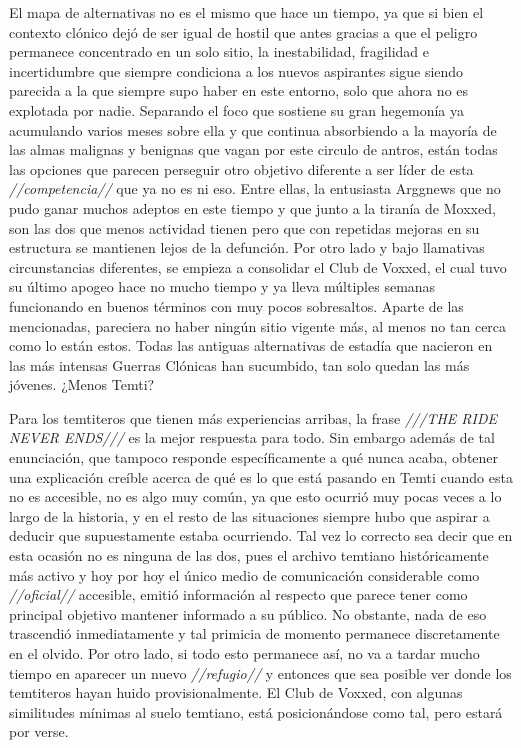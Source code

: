 \documentclass[
  spanish,
]{book}
\begin{document}
El mapa de alternativas no es el mismo que hace un tiempo, ya que si bien el contexto clónico dejó de ser igual de hostil que antes gracias a que el peligro permanece concentrado en un solo sitio, la inestabilidad, fragilidad e incertidumbre que siempre condiciona a los nuevos aspirantes sigue siendo parecida a la que siempre supo haber en este entorno, solo que ahora no es explotada por nadie. Separando el foco que sostiene su gran hegemonía ya acumulando varios meses sobre ella y que continua absorbiendo a la mayoría de las almas malignas y benignas que vagan por este circulo de antros, están todas las opciones que parecen perseguir otro objetivo diferente a ser líder de esta \emph{//competencia//} que ya no es ni eso. Entre ellas, la entusiasta Arggnews que no pudo ganar muchos adeptos en este tiempo y que junto a la tiranía de Moxxed, son las dos que menos actividad tienen pero que con repetidas mejoras en su estructura se mantienen lejos de la defunción. Por otro lado y bajo llamativas circunstancias diferentes, se empieza a consolidar el Club de Voxxed, el cual tuvo su último apogeo hace no mucho tiempo y ya lleva múltiples semanas funcionando en buenos términos con muy pocos sobresaltos. Aparte de las mencionadas, pareciera no haber ningún sitio vigente más, al menos no tan cerca como lo están estos. Todas las antiguas alternativas de estadía que nacieron en las más intensas Guerras Clónicas han sucumbido, tan solo quedan las más jóvenes. ¿Menos Temti?

Para los temtiteros que tienen más experiencias arribas, la frase \emph{///THE RIDE NEVER ENDS///} es la mejor respuesta para todo. Sin embargo además de tal enunciación, que tampoco responde específicamente a qué nunca acaba, obtener una explicación creíble acerca de qué es lo que está pasando en Temti cuando esta no es accesible, no es algo muy común, ya que esto ocurrió muy pocas veces a lo largo de la historia, y en el resto de las situaciones siempre hubo que aspirar a deducir que supuestamente estaba ocurriendo. Tal vez lo correcto sea decir que en esta ocasión no es ninguna de las dos, pues el archivo temtiano históricamente más activo y hoy por hoy el único medio de comunicación considerable como \emph{//oficial//} accesible, emitió información al respecto que parece tener como principal objetivo mantener informado a su público. No obstante, nada de eso trascendió inmediatamente y tal primicia de momento permanece discretamente en el olvido. Por otro lado, si todo esto permanece así, no va a tardar mucho tiempo en aparecer un nuevo \emph{//refugio//} y entonces que sea posible ver donde los temtiteros hayan huido provisionalmente. El Club de Voxxed, con algunas similitudes mínimas al suelo temtiano, está posicionándose como tal, pero estará por verse.
\end{document}
